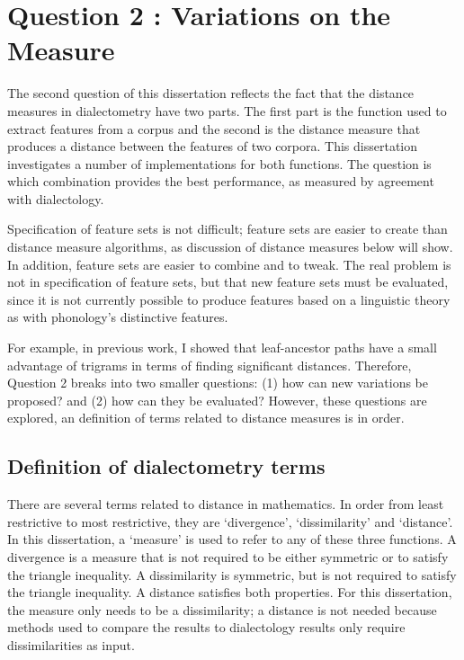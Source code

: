 \section{Question 2 : Variations on the Measure}

The second question of this dissertation reflects the fact that the
distance measures in dialectometry have two
parts. The first part is the function used to extract features from a
corpus and the second is the distance measure that produces a distance
between the features of two corpora. This dissertation investigates a
number of implementations for both functions. The question is which
combination provides the best performance, as measured by agreement
with dialectology.

Specification of feature sets is not difficult; feature sets are
easier to create than distance measure algorithms, as discussion of
distance measures below will show. In addition, feature sets are
easier to combine and to tweak. The real problem is not in
specification of feature sets, but that new feature sets must be
evaluated, since it is not currently possible to produce features
based on a linguistic theory as with phonology's distinctive features.

For example, in previous work, I showed that leaf-ancestor paths have
a small advantage of trigrams \cite{sanders07} in terms of finding
significant distances. Therefore, Question 2 breaks into two smaller
questions: (1) how can new variations be proposed? and (2) how can
they be evaluated? However, these questions are explored, an
definition of terms related to distance measures is in order.

\subsection{Definition of dialectometry terms}

There are several terms related to distance in mathematics. In order
from least restrictive to most restrictive, they are `divergence',
`dissimilarity' and `distance'. In this dissertation, a `measure' is
used to refer to any of these three functions. A divergence is a
measure that is not required to be either symmetric or to satisfy the
triangle inequality. A dissimilarity is symmetric, but is not required
to satisfy the triangle inequality. A distance satisfies both
properties. For this dissertation, the measure only needs to be a
dissimilarity; a distance is not needed because methods used to compare
the results to dialectology results only require dissimilarities as
input.

